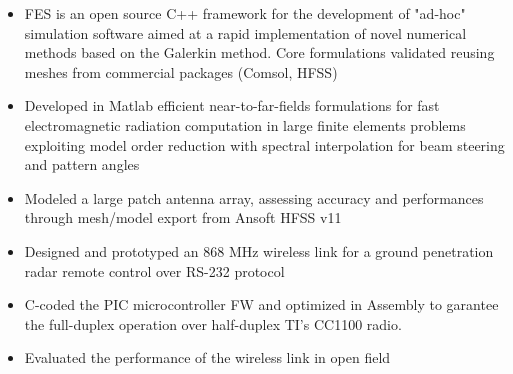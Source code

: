 \documentclass[9pt,a4paper,ragged2e,withhyper]{altacv} %
\begin{document}
\begin{paracol}{2}
\begin{itemize}
\item FES is an open source C++ framework for the development of "ad-hoc" simulation
software aimed at a rapid implementation of novel numerical methods based on the
Galerkin method. Core formulations validated reusing meshes from commercial
packages (Comsol, HFSS)
\end{itemize}
\divider

\begin{itemize}
\item Developed in Matlab efficient near-to-far-fields formulations for fast electromagnetic radiation computation in large finite elements problems exploiting model order
reduction with spectral interpolation for beam steering and pattern angles
\item Modeled a large patch antenna array, assessing accuracy and performances through mesh/model export from Ansoft HFSS v11
\end{itemize}
\divider


\begin{itemize}
    \item Designed and prototyped an 868 MHz wireless link for a ground penetration radar
remote control over RS-232 protocol
\item C-coded the PIC microcontroller FW and
optimized in Assembly to garantee the full-duplex operation over half-duplex TI’s
CC1100 radio. 
\item Evaluated the performance of the wireless link in open field
\end{itemize}





\end{paracol}
\end{document}
